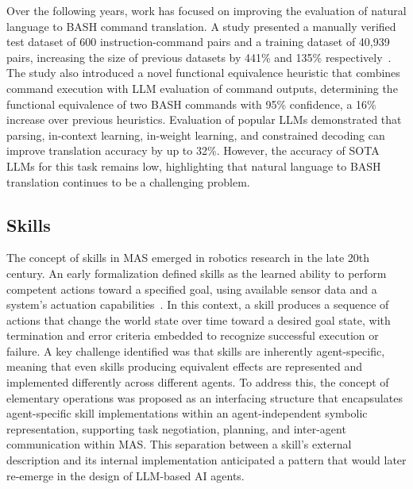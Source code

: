 \documentclass[
english,                 %
bibtex,                  %
includeExtraAbstracts, %
]{kththesis}
\numberwithin{listing}{chapter}
\begin{document}
Over the following years, work has focused on improving the evaluation of natural language to \gls{BASH} command translation. A study presented a manually verified test dataset of 600 instruction-command pairs and a training dataset of 40,939 pairs, increasing the size of previous datasets by 441\% and 135\% respectively~\cite{westenfelder_llm-supported_2025}. The study also introduced a novel functional equivalence heuristic that combines command execution with \gls{LLM} evaluation of command outputs, determining the functional equivalence of two \gls{BASH} commands with 95\% confidence, a 16\% increase over previous heuristics. Evaluation of popular \glspl{LLM} demonstrated that parsing, in-context learning, in-weight learning, and constrained decoding can improve translation accuracy by up to 32\%. However, the accuracy of \gls{SOTA} \glspl{LLM} for this task remains low, highlighting that natural language to \gls{BASH} translation continues to be a challenging problem.

\subsection{Skills}

The concept of skills in \gls{MAS} emerged in robotics research in the late 20th century. An early formalization defined skills as the learned ability to perform competent actions toward a specified goal, using available sensor data and a system's actuation capabilities~\cite{friedrich_integrating_1998}. In this context, a skill produces a sequence of actions that change the world state over time toward a desired goal state, with termination and error criteria embedded to recognize successful execution or failure. A key challenge identified was that skills are inherently agent-specific, meaning that even skills producing equivalent effects are represented and implemented differently across different agents. To address this, the concept of elementary operations was proposed as an interfacing structure that encapsulates agent-specific skill implementations within an agent-independent symbolic representation, supporting task negotiation, planning, and inter-agent communication within \gls{MAS}. This separation between a skill's external description and its internal implementation anticipated a pattern that would later re-emerge in the design of \gls{LLM}-based \gls{AI} agents.
\end{document}
